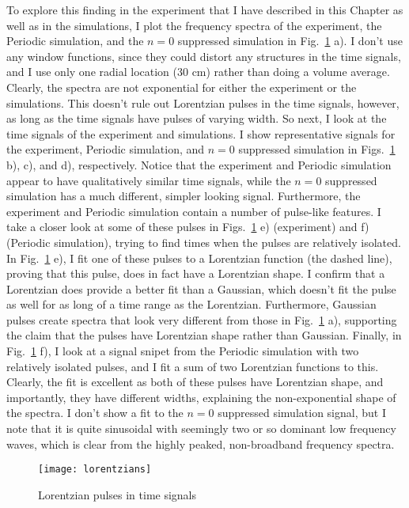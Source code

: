To explore this finding in the experiment that I have described in this Chapter as well as in the simulations, I plot the frequency spectra of the experiment,
the Periodic simulation, and the $n=0$ suppressed simulation in Fig.~\ref{lorentzians} a). I don't use any window functions, since they could distort any structures in the time signals,
and I use only one radial location (30 cm) rather than doing a volume average. Clearly, the spectra are not exponential for either the experiment or the simulations. This doesn't rule out
Lorentzian pulses in the time signals, however, as long as the time signals have pulses of varying width. So next, I look at the time signals of the experiment and simulations. I show representative
signals for the experiment, Periodic simulation, and $n=0$ suppressed simulation in Figs.~\ref{lorentzians} b), c), and d), respectively. Notice that the experiment and Periodic simulation
appear to have qualitatively similar time signals, while the $n=0$ suppressed simulation has a much different, simpler looking signal. Furthermore, the experiment and Periodic simulation contain
a number of pulse-like features. I take a closer look at some of these pulses in Figs.~\ref{lorentzians} e) (experiment) and f) (Periodic simulation), trying to find times when the pulses
are relatively isolated. In Fig.~\ref{lorentzians} e), I fit one of these pulses to a Lorentzian function (the dashed line), 
proving that this pulse, does in fact have a Lorentzian shape. I confirm that a Lorentzian does provide a better fit than a Gaussian, which doesn't fit the pulse as well for as long of a time
range as the Lorentzian. Furthermore, Gaussian pulses create spectra that look very different from those in Fig.~\ref{lorentzians} a), supporting the claim that the pulses have Lorentzian
shape rather than Gaussian. Finally, in Fig.~\ref{lorentzians} f),
I look at a signal snipet from the Periodic simulation with two relatively isolated pulses, and I fit a sum of two Lorentzian functions to this. Clearly, the fit is excellent as
both of these pulses have Lorentzian shape, and importantly, they have different widths, explaining the non-exponential shape of the spectra. I don't show a fit to the $n=0$ suppressed simulation
signal, but I note that it is quite sinusoidal with seemingly two or so dominant low frequency waves, which is clear from the highly peaked, non-broadband frequency spectra.

\begin{figure}[!ht]
\centerline{\texttt{[image: lorentzians]}}
\caption{Lorentzian pulses in time signals}
\label{lorentzians}
\end{figure}

